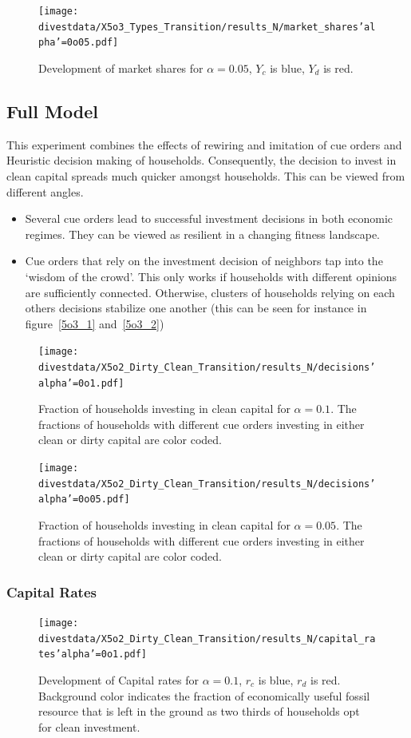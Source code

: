 \begin{figure}[H]
	\centering
	\texttt{[image: divestdata/X5o3\_Types\_Transition/results\_N/market\_shares'alpha'=0o05.pdf]}
	\caption{Development of market shares for $\alpha=0.05$, $Y_c$ is blue, $Y_d$ is red.}

\end{figure}


\subsection{Full Model}
This experiment combines the effects of rewiring and imitation of cue orders and Heuristic decision making of households. Consequently, the decision to invest in clean capital spreads much quicker amongst households. This can be viewed from different angles.
\begin{itemize}
	\item Several cue orders lead to successful investment decisions in both economic regimes. They can be viewed as resilient in a changing fitness landscape.
	\item Cue orders that rely on the investment decision of neighbors tap into the `wisdom of the crowd'. This only works if households with different opinions are sufficiently connected. Otherwise, clusters of households relying on each others decisions stabilize one another (this can be seen for instance in figure~\ref{5o3_1} and~\ref{5o3_2})
\end{itemize}

\begin{figure}[H]
	\centering
	\texttt{[image: divestdata/X5o2\_Dirty\_Clean\_Transition/results\_N/decisions'alpha'=0o1.pdf]}
	\caption{Fraction of households investing in clean capital for $\alpha=0.1$. The fractions of households with different cue orders investing in either clean or dirty capital are color coded.}
	\label{5o2_1}
\end{figure}
\begin{figure}[H]
	\centering
	\texttt{[image: divestdata/X5o2\_Dirty\_Clean\_Transition/results\_N/decisions'alpha'=0o05.pdf]}
	\caption{Fraction of households investing in clean capital for $\alpha=0.05$. The fractions of households with different cue orders investing in either clean or dirty capital are color coded.}
	\label{5o2_2}
\end{figure}
\subsubsection{Capital Rates}
\begin{figure}[H]
	\centering
	\texttt{[image: divestdata/X5o2\_Dirty\_Clean\_Transition/results\_N/capital\_rates'alpha'=0o1.pdf]}
	\caption{Development of Capital rates for $\alpha=0.1$, $r_c$ is blue, $r_d$ is red. Background color indicates the fraction of economically useful fossil resource that is left in the ground as two thirds of households opt for clean investment.}

\end{figure}

